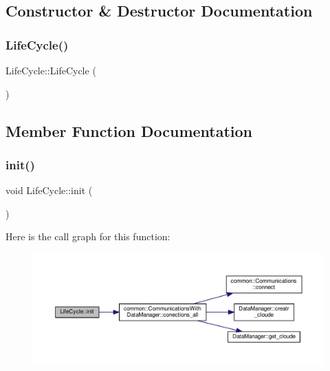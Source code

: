 \subsection{Constructor \& Destructor Documentation}
\mbox{\label{classLifeCycle_a2139a69c371e061d2ad626701bf1fab5}} 
\subsubsection{\texorpdfstring{Life\+Cycle()}{LifeCycle()}}
{\footnotesize\ttfamily Life\+Cycle\+::\+Life\+Cycle (\begin{DoxyParamCaption}{ }\end{DoxyParamCaption})}



\subsection{Member Function Documentation}
\mbox{\label{classLifeCycle_a86541e15b85f778204faad649e56bee6}} 
\subsubsection{\texorpdfstring{init()}{init()}}
{\footnotesize\ttfamily void Life\+Cycle\+::init (\begin{DoxyParamCaption}{ }\end{DoxyParamCaption})}

Here is the call graph for this function\+:
\nopagebreak
\begin{figure}[H]
\begin{center}
\leavevmode
\includegraphics[width=350pt]{classLifeCycle_a86541e15b85f778204faad649e56bee6_cgraph}
\end{center}
\end{figure}
\mbox{\label{classLifeCycle_a75a15308cad92f73d7bc9cec52419e41}} 
